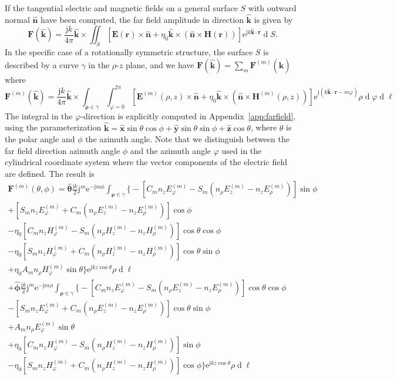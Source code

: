 \documentclass[a4paper,12pt]{article}
\renewcommand{\vec}[1]{\boldsymbol{#1}}
\newcommand{\unitvec}[1]{\hat{\vec{#1}}}
\newcommand{\mrm}[1]{\mathrm{#1}}
\newcommand{\diff}{\operatorname{d}\!}
\newcommand{\ju}{\mrm{j}}
\newcommand{\eu}{\mrm{e}}
\newcommand{\Ev}{\vec{E}}
\newcommand{\Hv}{\vec{H}}
\newcommand{\Fv}{\vec{F}}
\newcommand{\rv}{\vec{r}}
\newcommand{\xuv}{\unitvec{x}}
\newcommand{\yuv}{\unitvec{y}}
\newcommand{\zuv}{\unitvec{z}}
\newcommand{\nuv}{\unitvec{n}}
\newcommand{\kuv}{\unitvec{k}}
\newcommand{\thetauv}{\unitvec{\theta}}
\newcommand{\phiuv}{\unitvec{\phi}}
\begin{document}
If the tangential electric and magnetic fields on a general surface
$S$ with outward normal $\nuv$ have been computed, the far field
amplitude in direction $\kuv$ is given by
\begin{equation}
  \Fv(\kuv) = \frac{\ju k}{4\pi} \kuv\times \iint_{S} \left[ \Ev(\rv)\times\nuv + \eta_{0}\kuv\times(\nuv\times\Hv(\rv)) \right] \eu^{\ju k\kuv\cdot\rv} \diff S.
\end{equation}
In the specific case of a rotationally symmetric structure, the
surface $S$ is described by a curve $\gamma$ in the $\rho$-$z$ plane,
and we have $\Fv(\kuv) = \sum_{m}\Fv^{(m)}(\kuv)$ where
\begin{equation}
  \Fv^{(m)}(\kuv) = \frac{\ju k}{4\pi} \kuv\times \int_{\vec{\rho}\in\gamma}\int_{\varphi=0}^{2\pi} \left[ \Ev^{(m)}(\rho,z)\times\nuv + \eta_{0}\kuv\times(\nuv\times\Hv^{(m)}(\rho,z)) \right] \eu^{\ju(k\kuv\cdot\rv-m\varphi)} \rho\diff\varphi\diff\ell
\end{equation}
The integral in the $\varphi$-direction is explicitly computed in
Appendix~\ref{app:farfield}, using the parameterization
$\kuv = \xuv\sin\theta\cos\phi + \yuv\sin\theta\sin\phi +
\zuv\cos\theta$, where $\theta$ is the polar angle and $\phi$ the
azimuth angle. Note that we distinguish between the far field
direction azimuth angle $\phi$ and the azimuth angle $\varphi$ used in
the cylindrical coordinate system where the vector components of the
electric field are defined. The result is
\begin{multline}
  \Fv^{(m)}(\theta,\phi) = \thetauv\frac{\ju k}{2}\ju^{m}\eu^{-\ju
    m\phi} \int_{\vec{\rho}\in\gamma} \Big\{ - \left[ C_{m}
    n_{z}E_{\varphi}^{(m)}
    - S_{m} (n_{\rho}E_{z}^{(m)} - n_{z}E_{\rho}^{(m)}) \right] \sin\phi \\
  + \left[ S_{m} n_{z}E_{\varphi}^{(m)}
    + C_{m} (n_{\rho}E_{z}^{(m)} - n_{z}E_{\rho}^{(m)}) \right] \cos\phi \\
  - \eta_{0} \left[ C_{m} n_{z}H_{\varphi}^{(m)}
    - S_{m} (n_{\rho}H_{z}^{(m)} - n_{z}H_{\rho}^{(m)}) \right] \cos\theta\cos\phi \\
  - \eta_{0}\left[ S_{m} n_{z}H_{\varphi}^{(m)}
    + C_{m} (n_{\rho}H_{z}^{(m)} - n_{z}H_{\rho}^{(m)}) \right] \cos\theta\sin\phi \\
  + \eta_{0} A_{m} n_{\rho}H_{\varphi}^{(m)}
  \sin\theta \Big\} \eu^{\ju kz\cos\theta} \rho\diff\ell \\
  + \phiuv \frac{\ju k}{2} \ju^{m}\eu^{-\ju
    m\phi}\int_{\vec{\rho}\in\gamma} \Big\{ - \left[ C_{m}
    n_{z}E_{\varphi}^{(m)}
    - S_{m} (n_{\rho}E_{z}^{(m)} - n_{z}E_{\rho}^{(m)}) \right] \cos\theta\cos\phi \\
  - \left[ S_{m} n_{z}E_{\varphi}^{(m)}
    + C_{m} (n_{\rho}E_{z}^{(m)} - n_{z}E_{\rho}^{(m)}) \right] \cos\theta\sin\phi \\
  + A_{m} n_{\rho}E_{\varphi}^{(m)} \sin\theta \\
  + \eta_{0} \left[ C_{m} n_{z}H_{\varphi}^{(m)}
    - S_{m} (n_{\rho}H_{z}^{(m)} - n_{z}H_{\rho}^{(m)}) \right] \sin\phi \\
  - \eta_{0}\left[ S_{m} n_{z}H_{\varphi}^{(m)} +
    C_{m} (n_{\rho}H_{z}^{(m)} -
    n_{z}H_{\rho}^{(m)}) \right] \cos\phi \Big\} \eu^{\ju kz\cos\theta}
  \rho\diff\ell
\end{multline}
\end{document}
